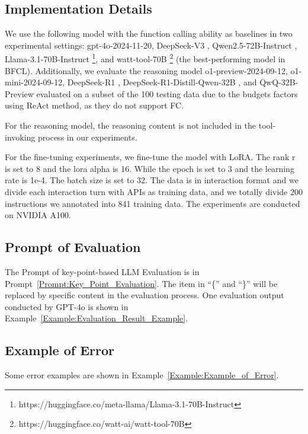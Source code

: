 \documentclass[11pt]{article}
\begin{document}
\subsection{Implementation Details}
We use the following model with the function calling ability as baselines in two experimental settings: gpt-4o-2024-11-20, DeepSeek-V3 \cite{deepseekai2024deepseekv3technicalreport}, Qwen2.5-72B-Instruct \cite{qwen2.5}, Llama-3.1-70B-Instruct \footnote{https://huggingface.co/meta-llama/Llama-3.1-70B-Instruct}, and watt-tool-70B \footnote{https://huggingface.co/watt-ai/watt-tool-70B} (the best-performing model in BFCL). 
Additionally, we evaluate the reasoning model o1-preview-2024-09-12, o1-mini-2024-09-12, DeepSeek-R1 \cite{deepseekai2025deepseekr1incentivizingreasoningcapability}, DeepSeek-R1-Distill-Qwen-32B \cite{deepseekai2025deepseekr1incentivizingreasoningcapability}, and QwQ-32B-Preview \cite{qwq-32b-preview} evaluated on a subset of the 100 testing data due to the budgets factors using ReAct method, as they do not support FC. 



For the reasoning model, the reasoning content is not included in the tool-invoking process in our experiments.

For the fine-tuning experiments, we fine-tune the model with LoRA. The rank r is set to 8 and the lora alpha is 16. While the epoch is set to 3 and the learning rate is 1e-4. The batch size is set to 32. The data is in interaction format and we divide each interaction turn with APIs as training data, and we totally divide 200 instructions we annotated into 841 training data. The experiments are conducted on NVIDIA A100.

\subsection{Prompt of Evaluation}
The Prompt of key-point-based LLM Evaluation is in Prompt~\ref{Prompt:Key_Point_Evaluation}. The item in ``\{'' and ``\}'' will be replaced by specific content in the evaluation process. One evaluation output conducted by GPT-4o is shown in Example~\ref{Example:Evaluation_Result_Example}.

\subsection{Example of Error}
\label{sec:appendix_example_error}
Some error examples are shown in Example~\ref{Example:Example_of_Error}.
\end{document}
